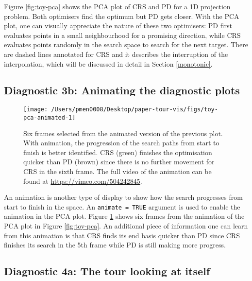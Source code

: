 Figure \ref{fig:toy-pca} shows the PCA plot of CRS and PD for a 1D
projection problem. Both optimisers find the optimum but PD gets closer.
With the PCA plot, one can visually appreciate the nature of these two
optimisers: PD first evaluates points in a small neighbourhood for a
promising direction, while CRS evaluates points randomly in the search
space to search for the next target. There are dashed lines annotated
for CRS and it describes the interruption of the interpolation, which
will be discussed in detail in Section \ref{monotonic}.

\hypertarget{diagnostic-3b-animating-the-diagnostic-plots}{%
\subsection{Diagnostic 3b: Animating the diagnostic
plots}\label{diagnostic-3b-animating-the-diagnostic-plots}}

\begin{Schunk}
\begin{figure}

{\centering \texttt{[image: /Users/pmen0008/Desktop/paper-tour-vis/figs/toy-pca-animated-1]} 

}

\caption{Six frames selected from the animated version of the previous plot. With animation, the progression of the search paths from start to finish is better identified. CRS (green) finishes the optimisation quicker than PD (brown) since there is no further movement for CRS in the sixth frame. The full video of the animation can be found at \url{https://vimeo.com/504242845}.}\label{fig:toy-pca-animated}
\end{figure}
\end{Schunk}

An animation is another type of display to show how the search
progresses from start to finish in the space. An
\texttt{animate\ =\ TRUE} argument is used to enable the animation in
the PCA plot. Figure \ref{fig:toy-pca-animated} shows six frames from
the animation of the PCA plot in Figure \ref{fig:toy-pca}. An additional
piece of information one can learn from this animation is that CRS finds
its end basis quicker than PD since CRS finishes its search in the 5th
frame while PD is still making more progress.

\hypertarget{diagnostic-4a-the-tour-looking-at-itself}{%
\subsection{Diagnostic 4a: The tour looking at
itself}\label{diagnostic-4a-the-tour-looking-at-itself}}

